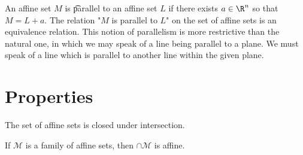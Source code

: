 An affine set $M$ is \t{parallel} to an affine set $L$ if there exists $a \in \R ^n$ so that $M = L + a$.
The relation "$M$ is parallel to $L$" on the set of affine sets is an equivalence relation.
This notion of parallelism is more restrictive than the natural one, in which we may speak of a line being parallel to a plane.
We must speak of a line which is parallel to another line within the given plane.

\section*{Properties}

The set of affine sets is closed under intersection.
\begin{proposition}If $\mathcal{M} $ is a family of affine sets, then $\cap \mathcal{M} $ is affine.\end{proposition}

